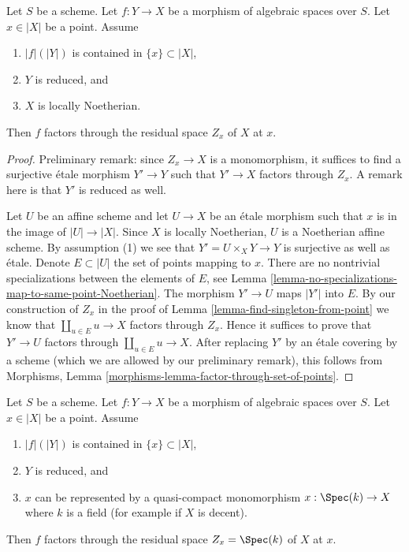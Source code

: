 \begin{lemma}
\label{lemma-factor-through-residual-space-Noetherian}
Let $S$ be a scheme. Let $f : Y \to X$ be a morphism of algebraic
spaces over $S$. Let $x \in |X|$ be a point. Assume
\begin{enumerate}
\item $|f|(|Y|)$ is contained in $\{x\} \subset |X|$,
\item $Y$ is reduced, and
\item $X$ is locally Noetherian.
\end{enumerate}
Then $f$ factors through the residual space $Z_x$ of $X$ at $x$.
\end{lemma}

\begin{proof}
Preliminary remark: since $Z_x \to X$ is a monomorphism, it suffices to find
a surjective \'etale morphism $Y' \to Y$ such that $Y' \to X$
factors through $Z_x$. A remark here is that $Y'$ is reduced as well.

\medskip\noindent
Let $U$ be an affine scheme and let $U \to X$ be an \'etale morphism
such that $x$ is in the image of $|U| \to |X|$. Since $X$ is locally
Noetherian, $U$ is a Noetherian affine scheme. By assumption (1)
we see that $Y' = U \times_X Y \to Y$ is surjective as well as \'etale.
Denote $E \subset |U|$ the set of points mapping to $x$.
There are no nontrivial specializations between the elements of $E$, see
Lemma \ref{lemma-no-specializations-map-to-same-point-Noetherian}.
The morphism $Y' \to U$ maps $|Y'|$ into $E$. By our construction
of $Z_x$ in the proof of Lemma \ref{lemma-find-singleton-from-point}
we know that $\coprod_{u \in E} u \to X$ factors through $Z_x$.
Hence it suffices to prove that $Y' \to U$ factors through
$\coprod_{u \in E} u \to X$. After replacing $Y'$ by an \'etale covering
by a scheme (which we are allowed by our preliminary remark), this follows
from Morphisms, Lemma \ref{morphisms-lemma-factor-through-set-of-points}.
\end{proof}

\begin{lemma}
\label{lemma-factor-through-residual-space-decent}
Let $S$ be a scheme. Let $f : Y \to X$ be a morphism of algebraic
spaces over $S$. Let $x \in |X|$ be a point. Assume
\begin{enumerate}
\item $|f|(|Y|)$ is contained in $\{x\} \subset |X|$,
\item $Y$ is reduced, and
\item $x$ can be represented by a quasi-compact monomorphism
$x : \Spec(k) \to X$ where $k$ is a field (for example if $X$ is decent).
\end{enumerate}
Then $f$ factors through
the residual space $Z_x = \Spec(k)$ of $X$ at $x$.
\end{lemma}

